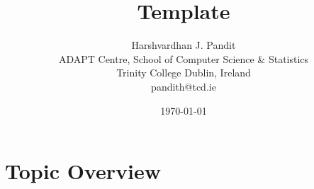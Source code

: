 \documentclass[11pt]{article}
\title{Template}
\author{
	Harshvardhan J. Pandit\\
	ADAPT Centre, School of Computer Science \& Statistics\\
	Trinity College Dublin, Ireland\\
	pandith@tcd.ie
	}
\date{\today}
\begin{document}
\maketitle

\section{Topic Overview}

\blindtext[20]
\end{document}
